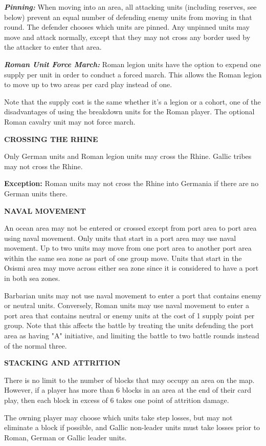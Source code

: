 \textit{\textbf{Pinning:}} When moving into an area, all attacking units (including reserves, see below) prevent an equal number of defending enemy units from moving in that round. The defender chooses which units are pinned. Any unpinned units may move and attack normally, except that they may not cross any border used by the attacker to enter that area.

\textit{\textbf{Roman Unit Force March:}} Roman legion units have the option to expend one supply per unit in order to conduct a forced march. This allows the Roman legion to move up to two areas per card play instead of one.

Note that the supply cost is the same whether it's a legion or a cohort, one of the disadvantages of using the breakdown units for the Roman player. The optional Roman cavalry unit may not force march.

\textbf{CROSSING THE RHINE}
\par
Only German units and Roman legion units may cross the Rhine. Gallic tribes may not cross the Rhine.

\textbf{Exception:} Roman units may not cross the Rhine into Germania if there are no German units there.

\textbf{NAVAL MOVEMENT}
\par
An ocean area may not be entered or crossed except from port area to port area using naval movement. Only units that start in a port area may use naval movement. Up to two units may move from one port area to another port area within the same sea zone as part of one group move. Units that start in the Osismi area may move across either sea zone since it is considered to have a port in both sea zones.

Barbarian units may not use naval movement to enter a port that contains enemy or neutral units. Conversely, Roman units may use naval movement to enter a port area that contains neutral or enemy units at the cost of 1 supply point per group. Note that this affects the battle by treating the units defending the port area as having "A" initiative, and limiting the battle to two battle rounds instead of the normal three.

\textbf{STACKING AND ATTRITION}
\par
There is no limit to the number of blocks that may occupy an area on the map. However, if a player has more than 6 blocks in an area at the end of their card play, then each block in excess of 6 takes one point of attrition damage.

The owning player may choose which units take step losses, but may not eliminate a block if possible, and Gallic non-leader units must take losses prior to Roman, German or Gallic leader units.

